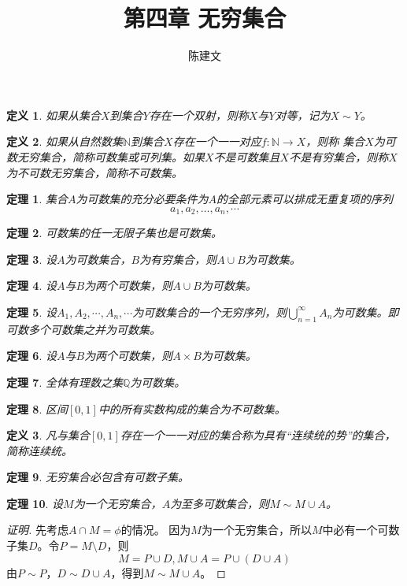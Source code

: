 \documentclass{article}
\newtheorem{Def}{定义}
\newtheorem{Thm}{定理}
\begin{document}
\begin{CJK*}{UTF8}{gbsn}
  \title{第四章 无穷集合}
  \author{陈建文}
  \maketitle
  

  \begin{Def}
    如果从集合$X$到集合$Y$存在一个双射，则称$X$与$Y$对等，记为$X \sim Y$。
  \end{Def}
  \begin{Def}
    如果从自然数集$\mathbb{N}$到集合$X$存在一个一一对应$f:\mathbb{N}\to X$，则称
    集合$X$为可数无穷集合，简称可数集或可列集。如果$X$不是可数集且$X$不是有穷集合，则称$X$为不可数无穷集合，简称不可数集。
  \end{Def}
  \begin{Thm}
    集合$A$为可数集的充分必要条件为$A$的全部元素可以排成无重复项的序列
    \[a_1, a_2, \ldots, a_n, \cdots\]
  \end{Thm}
    \begin{Thm}
       可数集的任一无限子集也是可数集。
  \end{Thm}
  \begin{Thm}
   设$A$为可数集合，$B$为有穷集合，则$A\cup B$为可数集。
  \end{Thm}
  \begin{Thm}
    设$A$与$B$为两个可数集，则$A\cup B$为可数集。
  \end{Thm}

    \begin{Thm}
    设$A_1, A_2, \cdots, A_n, \cdots$为可数集合的一个无穷序列，则$\bigcup_{n=1}^{\infty}A_n$为可数集。即可数多个可数集之并为可数集。
  \end{Thm}
  \begin{Thm}
    设$A$与$B$为两个可数集，则$A\times B$为可数集。
  \end{Thm}
  \begin{Thm}
    全体有理数之集$\mathbb{Q}$为可数集。
  \end{Thm}
  \begin{Thm}
    区间$[0,1]$中的所有实数构成的集合为不可数集。
  \end{Thm}
  \begin{Def}
    凡与集合$[0,1]$存在一个一一对应的集合称为具有“连续统的势”的集合，简称连续统。
  \end{Def}
    \begin{Thm}
    无穷集合必包含有可数子集。
  \end{Thm}
  \begin{Thm}
    设$M$为一个无穷集合，$A$为至多可数集合，则$M \sim M \cup A$。
  \end{Thm}
  \begin{proof}[证明]
    先考虑$A\cap M=\phi$的情况。
    因为$M$为一个无穷集合，所以$M$中必有一个可数子集$D$。令$P=M\setminus D$，则
    \[M=P\cup D, M\cup A = P\cup (D\cup A)\]
    由$P\sim P$，$D\sim D\cup A$，得到$M\sim M\cup A$。


\end{proof}
\end{CJK*}
\end{document}
